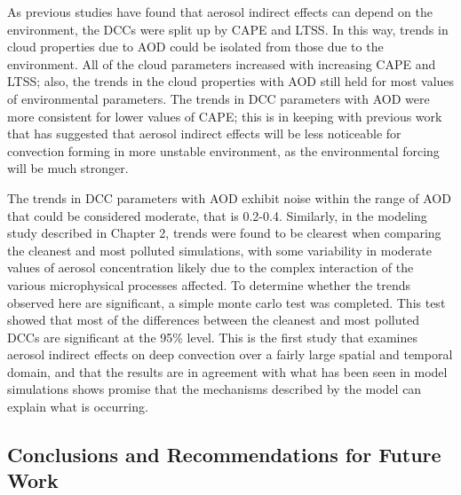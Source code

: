 As previous studies have found that aerosol indirect effects can depend on the environment, the DCCs were split up by CAPE and LTSS.  In this way, trends in cloud properties due to AOD could be isolated from those due to the environment.  All of the cloud parameters increased with increasing CAPE and LTSS; also, the trends in the cloud properties with AOD still held for most values of environmental parameters.  The trends in DCC parameters with AOD were more consistent for lower values of CAPE; this is in keeping with previous work that has suggested that aerosol indirect effects will be less noticeable for convection forming in more unstable environment, as the environmental forcing will be much stronger.  

The trends in DCC parameters with AOD exhibit noise within the range of AOD that could be considered moderate, that is 0.2-0.4.  Similarly, in the modeling study described in Chapter 2, trends were found to be clearest when comparing the cleanest and most polluted simulations, with some variability in moderate values of aerosol concentration likely due to the complex interaction of the various microphysical processes affected.  To determine whether the trends observed here are significant, a simple monte carlo test was completed.  This test showed that most of the differences between the cleanest and most polluted DCCs are significant at the 95\% level.  This is the first study that examines aerosol indirect effects on deep convection over a fairly large spatial and temporal domain, and that the results are in agreement with what has been seen in model simulations shows promise that the mechanisms described by the model can explain what is occurring.  


\subsection{Conclusions and Recommendations for Future Work}

